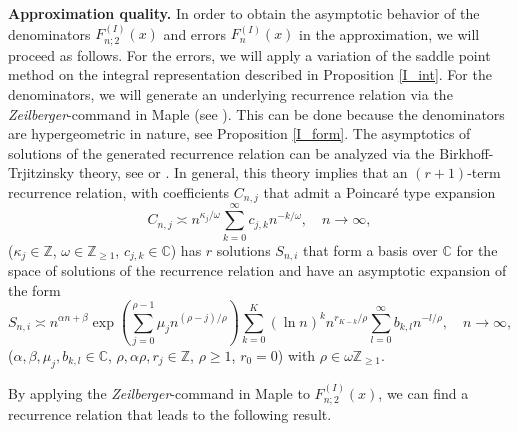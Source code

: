 \documentclass[a4paper,12pt,oneside]{article}
\theoremstyle{definition}
\newcommand{\Z}{\mathbb{Z}}
\newcommand{\C}{\mathbb{C}}
\begin{document}
\textbf{Approximation quality.} In order to obtain the asymptotic behavior of the denominators $F_{n;2}^{(I)}(x)$ and errors $F_{n}^{(I)}(x)$ in the approximation, we will proceed as follows. For the errors, we will apply a variation of the saddle point method on the integral representation described in Proposition \ref{I_int}. For the denominators, we will generate an underlying recurrence relation via the \textit{Zeilberger}-command in Maple (see \cite{A=B}). This can be done because the denominators are hypergeometric in nature, see Proposition \ref{I_form}. The asymptotics of solutions of the generated recurrence relation can be analyzed via the Birkhoff-Trjitzinsky theory, see \cite{BT} or \cite{WimpZeil}. In general, this theory implies that an $(r+1)$-term recurrence relation, with coefficients $C_{n,j}$ that admit a Poincaré type expansion
    $$ C_{n,j} \asymp n^{\kappa_j/\omega} \sum_{k=0}^\infty c_{j,k} n^{-k/\omega},\quad n\to\infty ,$$
($\kappa_j\in\Z$, $\omega\in\Z_{\geq 1}$, $c_{j,k}\in\C$) has $r$ solutions $S_{n,i}$ that form a basis over $\C$ for the space of solutions of the recurrence relation and have an asymptotic expansion of the form
    $$S_{n,i} \asymp n^{\alpha n + \beta} \exp\left(\sum_{j=0}^{\rho-1} \mu_j n^{(\rho-j)/\rho}\right) \sum_{k=0}^K (\ln n)^k n^{r_{K-k}/\rho} \sum_{l=0}^\infty b_{k,l} n^{-l/\rho}, \quad n\to\infty, $$
($\alpha,\beta,\mu_j,b_{k,l}\in\C$, $\rho,\alpha\rho,r_j\in\Z$, $\rho\geq 1$, $r_0=0$) with $\rho\in\omega \Z_{\geq 1}$.
\medbreak

By applying the \textit{Zeilberger}-command in Maple to $F_{n;2}^{(I)}(x)$, we can find a recurrence relation that leads to the following result.
\end{document}
